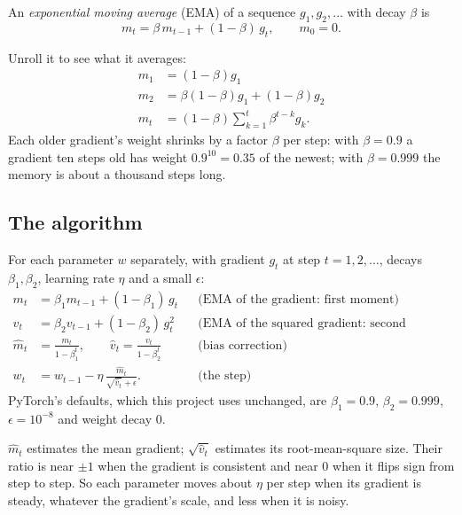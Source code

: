 \begin{definition}
An \emph{exponential moving average} (EMA) of a sequence $g_1, g_2, \dots$ with decay $\beta$ is
\[
m_t = \beta\,m_{t-1} + (1 - \beta)\,g_t, \qquad m_0 = 0.
\]
\end{definition}
Unroll it to see what it averages:
\begin{align*}
m_1 &= (1-\beta)g_1\\
m_2 &= \beta(1-\beta)g_1 + (1-\beta)g_2\\
m_t &= (1-\beta)\sum_{k=1}^{t}\beta^{t-k}g_k .
\end{align*}
Each older gradient's weight shrinks by a factor $\beta$ per step: with $\beta = 0.9$ a gradient
ten steps old has weight $0.9^{10} = 0.35$ of the newest; with $\beta = 0.999$ the memory is
about a thousand steps long.

\subsection{The algorithm}

\begin{definition}[Adam]
For each parameter $w$ separately, with gradient $g_t$ at step $t = 1, 2, \dots$, decays
$\beta_1, \beta_2$, learning rate $\eta$ and a small $\epsilon$:
\begin{align}
m_t &= \beta_1 m_{t-1} + (1 - \beta_1)\,g_t && \text{(EMA of the gradient: first moment)}\label{eq:trainloop:m}\\
v_t &= \beta_2 v_{t-1} + (1 - \beta_2)\,g_t^2 && \text{(EMA of the squared gradient: second moment)}\label{eq:trainloop:v}\\
\hat{m}_t &= \frac{m_t}{1 - \beta_1^t}, \qquad \hat{v}_t = \frac{v_t}{1 - \beta_2^t} && \text{(bias correction)}\label{eq:trainloop:bias}\\
w_t &= w_{t-1} - \eta\,\frac{\hat{m}_t}{\sqrt{\hat{v}_t} + \epsilon}. && \text{(the step)}\label{eq:trainloop:adamstep}
\end{align}
PyTorch's defaults, which this project uses unchanged, are $\beta_1 = 0.9$, $\beta_2 = 0.999$,
$\epsilon = 10^{-8}$ and weight decay 0.
\end{definition}

$\hat{m}_t$ estimates the mean gradient; $\sqrt{\hat{v}_t}$ estimates its root-mean-square size.
Their ratio is near $\pm 1$ when the gradient is consistent and near 0 when it flips sign from
step to step. So each parameter moves about $\eta$ per step when its gradient is steady, whatever
the gradient's scale, and less when it is noisy.

